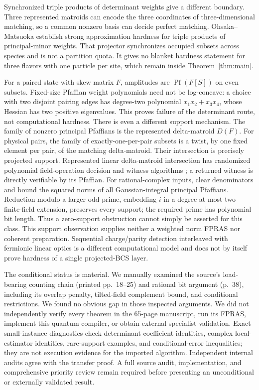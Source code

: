 \documentclass[11pt]{article}
\theoremstyle{remark}
\newcommand{\Pf}{\operatorname{Pf}}
\begin{document}
Synchronized triple products of determinant weights give a different boundary. Three represented matroids can encode the three coordinates of three-dimensional matching, so a common nonzero basis can decide perfect matching. Ohsaka--Matsuoka \cite{OM} establish strong approximation hardness for triple products of principal-minor weights. That projector synchronizes occupied subsets across species and is not a partition quota. It gives no blanket hardness statement for three flavors with one particle per site, which remain inside Theorem~\ref{thm:main}.

For a paired state with skew matrix $F$, amplitudes are $\Pf(F[S])$ on even subsets. Fixed-size Pfaffian weight polynomials need not be log-concave: a choice with two disjoint pairing edges has degree-two polynomial $x_1x_2+x_3x_4$, whose Hessian has two positive eigenvalues. This proves failure of the determinant route, not computational hardness. There is even a different support mechanism. The family of nonzero principal Pfaffians is the represented delta-matroid $D(F)$. For physical pairs, the family of exactly-one-per-pair subsets is a twist, by one fixed element per pair, of the matching delta-matroid. Their intersection is precisely projected support. Represented linear delta-matroid intersection has randomized polynomial field-operation decision and witness algorithms \cite{KW}; a returned witness is directly verifiable by its Pfaffian. For rational-complex inputs, clear denominators and bound the squared norms of all Gaussian-integral principal Pfaffians. Reduction modulo a larger odd prime, embedding $i$ in a degree-at-most-two finite-field extension, preserves every support; the required prime has polynomial bit length. Thus a zero-support obstruction cannot simply be asserted for this class. This support observation supplies neither a weighted norm FPRAS nor coherent preparation. Sequential charge/parity detection interleaved with fermionic linear optics \cite{Beenakker,DT} is a different computational model and does not by itself prove hardness of a single projected-BCS layer.

The conditional status is material. We manually examined the source's load-bearing counting chain (printed pp.~18--25) and rational bit argument (p.~38), including its overlap penalty, tilted-field complement bound, and conditional restrictions. We found no obvious gap in those inspected arguments. We did not independently verify every theorem in the 65-page manuscript, run its FPRAS, implement this quantum compiler, or obtain external specialist validation. Exact small-instance diagnostics check determinant coefficient identities, complex local-estimator identities, rare-support examples, and conditional-error inequalities; they are not execution evidence for the imported algorithm. Independent internal audits agree with the transfer proof. A full source audit, implementation, and comprehensive priority review remain required before presenting an unconditional or externally validated result.
\end{document}

